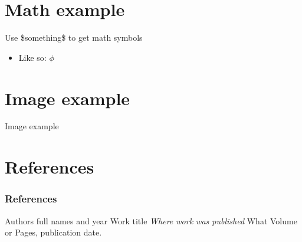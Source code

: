\documentclass{beamer}
\begin{document}

\section{Math example}
\begin{frame}{Use \$something\$ to get math symbols}
    \begin{itemize}
        \item Like so: $\phi$
    \end{itemize}
\end{frame}


\section{Image example}
\begin{frame}{Image example}
    \begin{figure}
        \centering
        \label{fig:1}
    \end{figure}
\end{frame}


\section{References}
\begin{frame}
    \frametitle{References}
    \footnotesize{
        \begin{thebibliography}{99} %
             Authors full names and year
            \newblock Work title
            \newblock \emph{Where work was published} What Volume or Pages, publication date.
        \end{thebibliography}
    }
\end{frame}


\begin{frame}
    \titlepage %
\end{frame}

\end{document}
